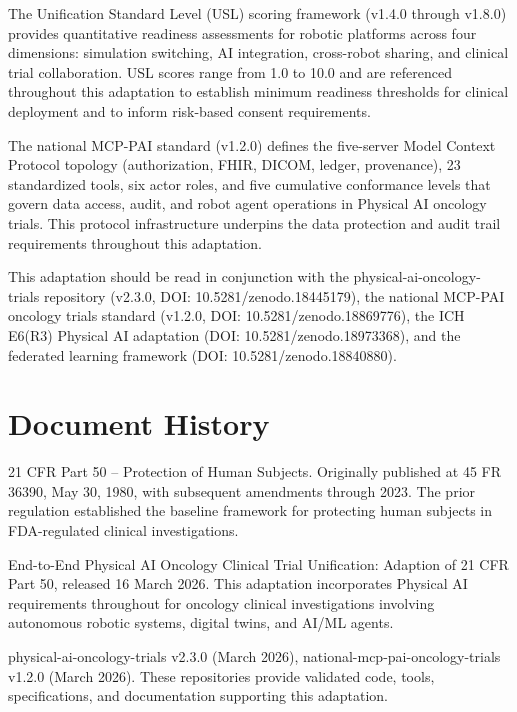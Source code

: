 \documentclass[11pt]{article}
\begin{document}
The Unification Standard Level (USL) scoring framework (v1.4.0 through v1.8.0) provides quantitative readiness assessments for robotic platforms across four dimensions: simulation switching, AI integration, cross-robot sharing, and clinical trial collaboration. USL scores range from 1.0 to 10.0 and are referenced throughout this adaptation to establish minimum readiness thresholds for clinical deployment and to inform risk-based consent requirements.

The national MCP-PAI standard (v1.2.0) defines the five-server Model Context Protocol topology (authorization, FHIR, DICOM, ledger, provenance), 23 standardized tools, six actor roles, and five cumulative conformance levels that govern data access, audit, and robot agent operations in Physical AI oncology trials. This protocol infrastructure underpins the data protection and audit trail requirements throughout this adaptation.

This adaptation should be read in conjunction with the physical-ai-oncology-trials repository (v2.3.0, DOI: 10.5281/zenodo.18445179), the national MCP-PAI oncology trials standard (v1.2.0, DOI: 10.5281/zenodo.18869776), the ICH E6(R3) Physical AI adaptation (DOI: 10.5281/zenodo.18973368), and the federated learning framework (DOI: 10.5281/zenodo.18840880).

\section*{Document History}

\begin{description}[leftmargin=3.8cm,style=sameline]
\item[Prior Regulation] 21 CFR Part 50 -- Protection of Human Subjects. Originally published at 45 FR 36390, May 30, 1980, with subsequent amendments through 2023. The prior regulation established the baseline framework for protecting human subjects in FDA-regulated clinical investigations.
\item[Current Adaptation] End-to-End Physical AI Oncology Clinical Trial Unification: Adaption of 21 CFR Part 50, released 16 March 2026. This adaptation incorporates Physical AI requirements throughout for oncology clinical investigations involving autonomous robotic systems, digital twins, and AI/ML agents.
\item[Repository Refs] physical-ai-oncology-trials v2.3.0 (March 2026), national-mcp-pai-oncology-trials v1.2.0 (March 2026). These repositories provide validated code, tools, specifications, and documentation supporting this adaptation.
\end{description}
\end{document}
